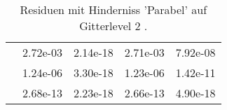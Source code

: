 \begin{table}
\begin{tabular}{c|cc|cc|}
\multicolumn{1}{|c|}{} & \multicolumn{1}{|c|}{  2.72e-03} & \multicolumn{1}{|c|}{  2.14e-18} & \multicolumn{1}{|c|}{  2.71e-03} & \multicolumn{1}{|c|}{  7.92e-08} \\ 
\multicolumn{1}{|c|}{} & \multicolumn{1}{|c|}{  1.24e-06} & \multicolumn{1}{|c|}{  3.30e-18} & \multicolumn{1}{|c|}{  1.23e-06} & \multicolumn{1}{|c|}{  1.42e-11} \\ 
\multicolumn{1}{|c|}{} & \multicolumn{1}{|c|}{  2.68e-13} & \multicolumn{1}{|c|}{  2.23e-18} & \multicolumn{1}{|c|}{  2.66e-13} & \multicolumn{1}{|c|}{  4.90e-18} \\ 
\hline 
\end{tabular}\caption{Residuen mit Hinderniss 'Parabel' auf Gitterlevel 2 .}\label{tab:Residuum_Parabel_level2}
\end{table} 
